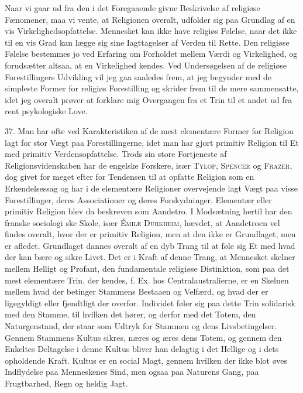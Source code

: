 \documentclass[12pt,a4paper,openany]{book}
\newcommand{\opage}[1]{\marginnote{\footnotesize\textit{[#1]}}}
\begin{document}
Naar vi gaar ud fra den i det Foregaaende givne Beskrivelse af religiøse
Fænomener, maa vi vente, at Religionen overalt, udfolder sig paa
Grundlag af en vis Virkelighedsopfattelse. Mennesket kan ikke have
religiøs Følelse, naar det ikke til en vis Grad kan lægge sig sine
Iagttagelser af Verden til Rette. Den religiøse Følelse bestemmes jo ved
Erfaring om Forholdet mellem Værdi og Virkelighed, og forudsætter
altsaa, at en Virkelighed kendes. Ved Undersøgelsen af de religiøse
Forestillingers Udvikling vil jeg gaa saaledes frem, at jeg begynder med
de simpleste Former for religiøs Forestilling og skrider frem til de
mere sammensatte, idet jeg overalt prøver at forklare mig Overgangen fra
et Trin til et andet ud fra rent psykologiske Love.

37. Man har ofte ved Karakteristiken af de mest elementære Former for
Religion lagt for stor Vægt paa Forestillingerne, idet man har gjort
primitiv Religion til Et med primitiv Verdensopfattelse. Trods sin store
Fortjeneste af Religionsvidenskaben har de engelske Forskere, især
\textsc{Tylop, Spencer} og \textsc{Frazer}, dog givet for meget efter
for Tendensen til at opfatte Religion som en Erkendelsessag og har i de
elementære Religioner overvejende lagt Vægt paa visse Forestillinger,
deres Associationer og deres Forskydninger. Elementær eller primitiv
Religion blev da beskreven som Aandetro. I Modsætning hertil har den
franske sociologi%
\opage{87}ske Skole, især \textsc{Émile Durkheim}, hævdet, at Aandetroen
vel findes overalt, hvor der er primitiv Religion, men at den ikke er
Grundlaget, men er afledet. Grundlaget dannes overalt af en dyb Trang
til at føle sig Et med hvad der kan bære og sikre Livet. Det er i Kraft
af denne Trang, at Mennesket skelner mellem Helligt og Profant, den
fundamentale religiøse Distinktion, som paa det mest elementære Trin,
der kendes, f. Ex. hos Centralaustralierne, er en Skelnen mellem hvad
der betinger Stammens Bestaaen og Velfærd, og hvad der er ligegyldigt
eller fjendtligt der overfor. Individet føler sig paa dette Trin
solidarisk med den Stamme, til hvilken det hører, og derfor med det
Totem, den Naturgenstand, der staar som Udtryk for Stammen og dens
Livsbetingelser. Gennem Stammens Kultus sikres, næres og æres dens
Totem, og gennem den Enkeltes Deltagelse i denne Kultus bliver han
delagtig i det Hellige og i dets opholdende Kraft. Kultus er en social
Magt, gennem hvilken der ikke blot øves Indflydelse paa Menneskenes
Sind, men ogsaa paa Naturens Gang, paa Frugtbarhed, Regn og heldig Jagt.
\end{document}
